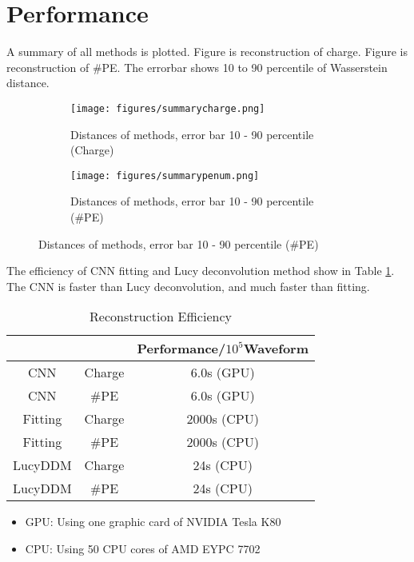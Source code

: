 \section{Performance} %
A summary of all methods is plotted. Figure \label{fig:chargesummary} is reconstruction of charge. Figure \label{fig:penumsummary} is reconstruction of \#PE. The errorbar shows 10 to 90 percentile of Wasserstein distance. 

\begin{figure}[H]
\begin{minipage}{.5\textwidth}
\begin{figure}[H]
    \centering
    \caption{Distances of methods, error bar 10 - 90 percentile (Charge)}
    \texttt{[image: figures/summarycharge.png]}
    \label{fig:chargesummary}
\end{figure}
\end{minipage}
\begin{minipage}{.5\textwidth}
\begin{figure}[H]
    \centering
    \caption{Distances of methods, error bar 10 - 90 percentile (\#PE)}
    \texttt{[image: figures/summarypenum.png]}
    \label{fig:penumsummary}
\end{figure}
\end{minipage}
\end{figure}

The efficiency of CNN fitting and Lucy deconvolution method show in Table \ref{fig:efficiency}. The CNN is faster than Lucy deconvolution, and much faster than fitting.  

\begin{table}[H]
    \centering
    \caption{Reconstruction Efficiency}
    \begin{tabular}{c|c|c}
        \hline
        &  & Performance/$10^{5}$Waveform \\
        \hline
        CNN & Charge & 6.0s (GPU) \\
        \hline
        CNN & \#PE & 6.0s (GPU)\\
        \hline
        Fitting & Charge & 2000s (CPU) \\
        \hline
        Fitting & \#PE & 2000s (CPU) \\
        \hline
        LucyDDM & Charge & 24s (CPU) \\
        \hline
        LucyDDM & \#PE & 24s (CPU) \\
        \hline
    \end{tabular}
    \label{fig:efficiency}
\end{table}
\hspace{4mm}
\begin{center}
\begin{itemize}
    \item GPU: Using one graphic card of NVIDIA Tesla K80
    \item CPU: Using 50 CPU cores of AMD EYPC 7702
\end{itemize}
\end{center}

